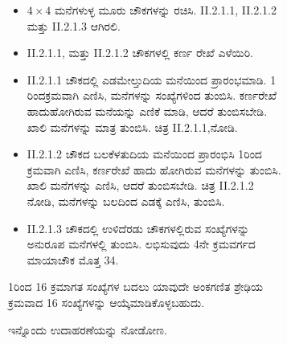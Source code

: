 \begin{figure}[H]
\begin{figure}[H]
\begin{itemize}
	\item $4 \times 4$ ಮನೆಗಳುಳ್ಳ ಮೂರು ಚೌಕಗಳನ್ನು ರಚಿಸಿ. II.2.1.1, II.2.1.2 ಮತ್ತು II.2.1.3 ಆಗಿರಲಿ.
	\item II.2.1.1, ಮತ್ತು II.2.1.2 ಚೌಕಗಳಲ್ಲಿ ಕರ್ಣ ರೇಖೆ ಎಳೆಯಿರಿ.
	\item II.2.1.1 ಚೌಕದಲ್ಲಿ ಎಡಮೇಲ್ತುದಿಯ ಮನೆಯಿಂದ ಪ್ರಾರಂಭಮಾಡಿ. 1 ರಿಂದ\break ಕ್ರಮವಾಗಿ ಎಣಿಸಿ, ಮನೆಗಳನ್ನು ಸಂಖ್ಯೆಗಳಿಂದ ತುಂಬಿಸಿ. ಕರ್ಣರೇಖೆ ಹಾದು\-ಹೋಗಿರುವ ಮನೆಯನ್ನು ಎಣಿಕೆ ಮಾಡಿ, ಆದರೆ ತುಂಬಿಸಬೇಡಿ. ಖಾಲಿ ಮನೆಗಳನ್ನು ಮಾತ್ರ ತುಂಬಿಸಿ. ಚಿತ್ರ II.2.1.1,ನೋಡಿ.
	\item II.2.1.2 ಚೌಕದ ಬಲಕೆಳತುದಿಯ ಮನೆಯಿಂದ ಪ್ರಾರಂಭಿಸಿ 1ರಿಂದ ಕ್ರಮವಾಗಿ ಎಣಿಸಿ, ಕರ್ಣರೇಖೆ ಹಾದು ಹೋಗಿರುವ ಮನೆಗಳನ್ನು ತುಂಬಿಸಿ. ಖಾಲಿ ಮನೆ\-ಗಳನ್ನು ಎಣಿಸಿ, ಆದರೆ ತುಂಬಿಸಬೇಡಿ. ಚಿತ್ರ II.2.1.2 ನೋಡಿ, ಮನೆಗಳನ್ನು ಬಲದಿಂದ ಎಡಕ್ಕೆ ಎಣಿಸಿ, ತುಂಬಿಸಿ.
	\item II.2.1.3 ಚೌಕದಲ್ಲಿ ಉಳಿದೆರಡು ಚೌಕಗಳಲ್ಲಿರುವ ಸಂಖ್ಯೆಗಳನ್ನು ಅನುರೂಪ ಮನೆಗಳಲ್ಲಿ ತುಂಬಿಸಿ. ಲಭಿಸುವುದು 4ನೇ ಕ್ರಮವರ್ಗದ ಮಾಯಾಚೌಕ ಮೊತ್ತ 34.
\end{itemize}

1ರಿಂದ 16 ಕ್ರಮಾಗತ ಸಂಖ್ಯೆಗಳ ಬದಲು ಯಾವುದೇ ಅಂಕಗಣಿತ ಶ್ರೇಢಿಯ ಕ್ರಮವಾದ 16 ಸಂಖ್ಯೆಗಳನ್ನು ಆಯ್ಕೆಮಾಡಿಕೊಳ್ಳಬಹುದು.

ಇನ್ನೊಂದು ಉದಾಹರಣೆಯನ್ನು ನೋಡೋಣ.


\end{figure}
\end{figure}
